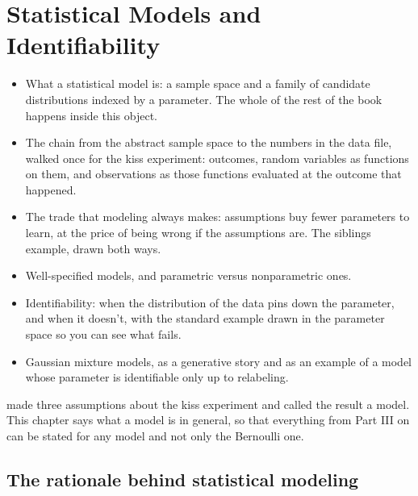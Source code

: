 \chapter{Statistical Models and Identifiability}
\label{ch:models}

\begin{chaptergoals}
\begin{itemize}[nosep]
\item What a statistical model is: a sample space and a family of candidate distributions indexed by a parameter. The whole of the rest of the book happens inside this object.
\item The chain from the abstract sample space to the numbers in the data file, walked once for the kiss experiment: outcomes, random variables as functions on them, and observations as those functions evaluated at the outcome that happened.
\item The trade that modeling always makes: assumptions buy fewer parameters to learn, at the price of being wrong if the assumptions are. The siblings example, drawn both ways.
\item Well-specified models, and parametric versus nonparametric ones.
\item Identifiability: when the distribution of the data pins down the parameter, and when it doesn't, with the standard example drawn in the parameter space so you can see what fails.
\item Gaussian mixture models, as a generative story and as an example of a model whose parameter is identifiable only up to relabeling.
\end{itemize}
 made three assumptions about the kiss experiment and called the result a model. This chapter says what a model is in general, so that everything from Part III on can be stated for any model and not only the Bernoulli one.
\end{chaptergoals}

\section{The rationale behind statistical modeling}
\label{sec:models-rationale}

